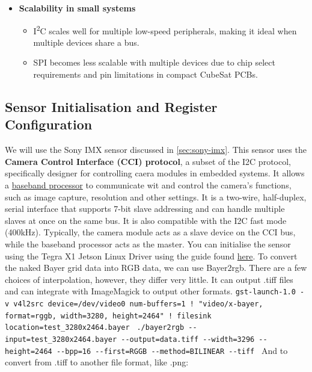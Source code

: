 \documentclass[10pt]{article}
\begin{document}
\begin{multicols}{2}
\begin{itemize}
    \item \textbf{Scalability in small systems}
    \begin{itemize}
        \item I\textsuperscript{2}C scales well for multiple low-speed peripherals, making it ideal when multiple devices share a bus.
        \item SPI becomes less scalable with multiple devices due to chip select requirements and pin limitations in compact CubeSat PCBs.
    \end{itemize}
\end{itemize}

\subsection{Sensor Initialisation and Register Configuration}
We will use the Sony IMX sensor discussed in \ref{sec:sony-imx}.
\newline \newline
This sensor uses the \textbf{Camera Control Interface (CCI) protocol}, a subset of the I2C protocol, specifically designer for controlling caera modules in embedded systems. It allows a \href{https://en.wikipedia.org/wiki/Baseband_processor}{baseband processor} to communicate wit and control the camera's functions, such as image capture, resolution and other settings.
It is a two-wire, half-duplex, serial interface that supports 7-bit slave addressing and can handle multiple slaves at once on the same bus. It is also compatible with the I2C fast mode (400kHz).
Typically, the camera module acts as a slave device on the CCI bus, while the baseband processor acts as the master.
\newline \newline
You can initialise the sensor using the Tegra X1 Jetson Linux Driver using the guide found \href{https://developer.ridgerun.com/wiki/index.php/Sony_IMX219_Linux_driver}{here}.
\newline
To convert the naked Bayer grid data into RGB data, we can use Bayer2rgb. There are a few choices of interpolation, however, they differ very little. It can output .tiff files and can integrate with ImageMagick to output other formats.
\verb|gst-launch-1.0 -v v4l2src device=/dev/video0 num-buffers=1 ! "video/x-bayer, format=rggb, width=3280, height=2464" ! filesink location=test_3280x2464.bayer |
\verb|./bayer2rgb --input=test_3280x2464.bayer --output=data.tiff --width=3296 --height=2464 --bpp=16 --first=RGGB --method=BILINEAR --tiff |
And to convert from .tiff to another file format, like .png:

\end{multicols}
\end{document}
